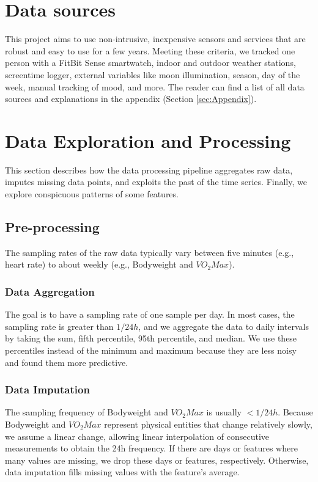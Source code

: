 \documentclass[conference]{IEEEtran}
\begin{document}

\section{Data sources}
This project aims to use non-intrusive, inexpensive sensors and services that are robust and easy to use for a few years.
Meeting these criteria, we tracked one person with a FitBit Sense smartwatch, indoor and outdoor weather stations, screentime logger, external variables like moon illumination, season, day of the week, manual tracking of mood, and more.
The reader can find a list of all data sources and explanations in the appendix (Section \ref{sec:Appendix}).

\section{Data Exploration and Processing}
This section describes how the data processing pipeline aggregates raw data, imputes missing data points, and exploits the past of the time series. Finally, we explore conspicuous patterns of some features.

\subsection{Pre-processing}
The sampling rates of the raw data typically vary between five minutes (e.g., heart rate) to about weekly (e.g., Bodyweight and $VO_2Max$).

\subsubsection{Data Aggregation}
The goal is to have a sampling rate of one sample per day.
In most cases, the sampling rate is greater than $1/24h$, and we aggregate the data to daily intervals by taking the sum, fifth percentile, 95th percentile, and median.
We use these percentiles instead of the minimum and maximum because they are less noisy and found them more predictive.

\subsubsection{Data Imputation}
The sampling frequency of Bodyweight and $VO_2Max$ is usually $<1/24h$.
Because Bodyweight and $VO_2Max$ represent physical entities that change relatively slowly, we assume a linear change, allowing linear interpolation of consecutive measurements to obtain the 24h frequency.
If there are days or features where many values are missing, we drop these days or features, respectively.
Otherwise, data imputation fills missing values with the feature's average.
\end{document}
